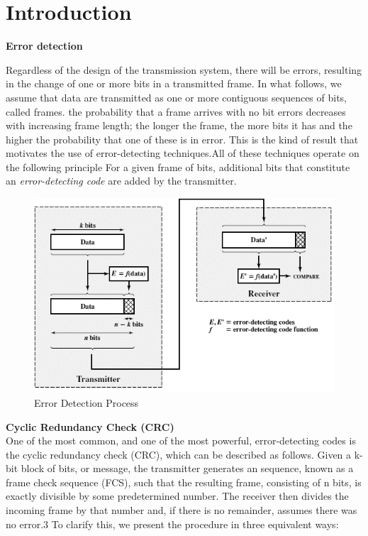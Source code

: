 \section{Introduction}

\textbf{Error detection}

Regardless of the design of the transmission system, there will be errors, resulting
in the change of one or more bits in a transmitted frame. In what follows, we assume that data are transmitted as one or more contiguous sequences of bits,
called frames. 
the probability that a frame arrives with no bit
errors decreases with increasing frame length; the longer the frame, the more bits it
has and the higher the probability that one of these is in error. This is the kind of result that motivates the use of error-detecting techniques.All
of these techniques operate on the following principle  For a given frame
of bits, additional bits that constitute an \emph{error-detecting code} are added by the transmitter.

\begin{figure}[!htbp]
	\centering
	\includegraphics [scale=0.55]{images/Intro/Imagen1.png}
	\caption{Error Detection Process}
\end{figure}



\textbf{Cyclic Redundancy Check (CRC)}\\

One of the most common, and one of the most powerful, error-detecting codes is the
cyclic redundancy check (CRC), which can be described as follows. Given a k-bit
block of bits, or message, the transmitter generates an sequence, known
as a frame check sequence (FCS), such that the resulting frame, consisting of n bits,
is exactly divisible by some predetermined number. The receiver then divides the
incoming frame by that number and, if there is no remainder, assumes there was no
error.3
To clarify this, we present the procedure in three equivalent ways:

